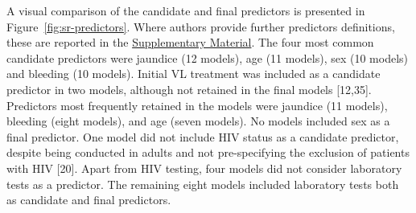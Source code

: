 A visual comparison of the candidate and final predictors is presented in Figure~\ref{fig:sr-predictors}. Where authors provide further predictors definitions, these are reported in the \href{https://github.com/jpwil/dphil}{Supplementary Material}. The four most common candidate predictors were jaundice (12 models), age (11 models), sex (10 models) and bleeding (10 models). Initial VL treatment was included as a candidate predictor in two models, although not retained in the final models [12,35]. Predictors most frequently retained in the models were jaundice (11 models), bleeding (eight models), and age (seven models). No models included sex as a final predictor. One model did not include HIV status as a candidate predictor, despite being conducted in adults and not pre-specifying the exclusion of patients with HIV [20]. Apart from HIV testing, four models did not consider laboratory tests as a predictor\cite{costaPredictingDeathKalaazar2016,coura-vitalPrognosticFactorsScoring2014,dearaujoEarlyClinicalManifestations2012}. The remaining eight models included laboratory tests both as candidate and final predictors\cite{abongomeraDevelopmentExternalValidation2017,costaPredictingDeathKalaazar2016,werneckPrognosticFactorsDeath2003,sampaioRiskFactorsDeath2010,kaminkClinicalSeverityScoring2017,foinquinosTemporalValidationPredictive2021}.

